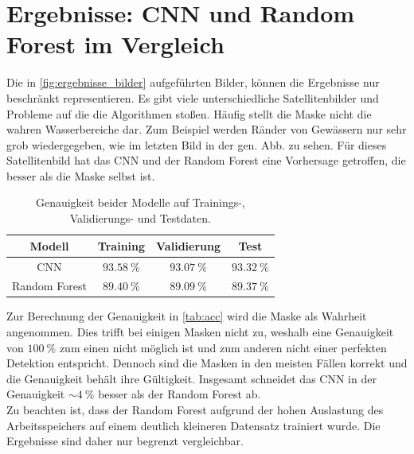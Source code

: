 \section{Ergebnisse: CNN und Random Forest im Vergleich}
\label{sec:vergleich}

Die in \autoref{fig:ergebnisse_bilder} aufgeführten Bilder, können die Ergebnisse nur beschränkt representieren.
Es gibt viele unterschiedliche Satellitenbilder und Probleme auf die die Algorithmen stoßen.
Häufig stellt die Maske nicht die wahren Wasserbereiche dar.
Zum Beispiel werden Ränder von Gewässern nur sehr grob wiedergegeben, wie im letzten Bild in der gen. Abb. zu sehen.
Für dieses Satellitenbild hat das CNN und der Random Forest eine Vorhersage getroffen, die besser als die Maske selbst ist.

\begin{table}
    \centering
    \caption{Genauigkeit beider Modelle auf Trainings-, Validierungs- und Testdaten.}
    \label{tab:acc}
    \begin{tabular}{c | c c c}
        \toprule
        Modell & Training & Validierung & Test \\
        \midrule
        CNN & $\SI{93.58}{\percent}$ & $\SI{93.07}{\percent}$ & $\SI{93.32}{\percent}$ \\
        Random Forest & $\SI{89.40}{\percent}$ & $\SI{89.09}{\percent}$ & $\SI{89.37}{\percent}$ \\
        \bottomrule
    \end{tabular}
\end{table}

Zur Berechnung der Genauigkeit in \autoref{tab:acc} wird die Maske als Wahrheit angenommen.
Dies trifft bei einigen Masken nicht zu, weshalb eine Genauigkeit von $\SI{100}{\percent}$ zum einen nicht möglich ist und zum anderen nicht einer perfekten Detektion entspricht.
Dennoch sind die Masken in den meisten Fällen korrekt und die Genauigkeit behält ihre Gültigkeit.
Insgesamt schneidet das CNN in der Genauigkeit $\sim \SI{4}{\percent}$ besser als der Random Forest ab.
\\
Zu beachten ist, dass der Random Forest aufgrund der hohen Auslastung des Arbeitsspeichers auf einem deutlich kleineren Datensatz trainiert wurde.
Die Ergebnisse sind daher nur begrenzt vergleichbar.

